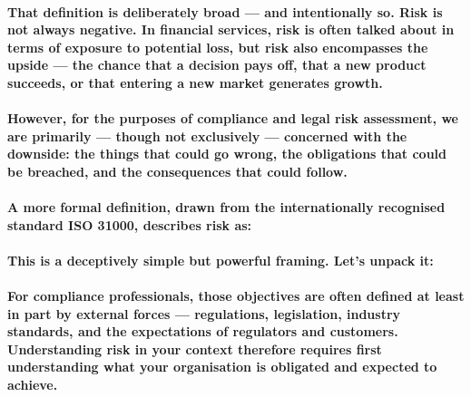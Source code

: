 \paragraph{That definition is deliberately broad — and intentionally so. Risk is not always negative. In financial services, risk is often talked about in terms of exposure to potential loss, but risk also encompasses the upside — the chance that a decision pays off, that a new product succeeds, or that entering a new market generates growth.}

\paragraph{However, for the purposes of compliance and legal risk assessment, we are primarily — though not exclusively — concerned with the downside: the things that could go wrong, the obligations that could be breached, and the consequences that could follow.}

\paragraph{A more formal definition, drawn from the internationally recognised standard ISO 31000, describes risk as: }


\paragraph{This is a deceptively simple but powerful framing. Let's unpack it:}

\begin{itemize}
\end{itemize}

\paragraph{For compliance professionals, those objectives are often defined at least in part by external forces — regulations, legislation, industry standards, and the expectations of regulators and customers. Understanding risk in your context therefore requires first understanding what your organisation is obligated and expected to achieve.}

